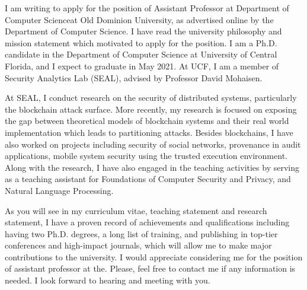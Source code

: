 \documentclass[10pt,stdletter]{newlfm}
\newcommand{\univ}{Old Dominion University}
\newcommand{\depart}{Department of Computer Science}
\begin{document}
\begin{newlfm}

I am writing to apply for the position of Assistant Professor at \depart at \univ, as advertised online by the \depart. I have read the university philosophy and mission statement which motivated to apply for the position. I am a Ph.D. candidate in the Department of Computer Science at University of Central Florida, and I expect to graduate in May 2021. At UCF, I am a member of Security Analytics Lab (SEAL), advised by Professor David Mohaisen. 

At SEAL, I conduct research on the security of distributed systems, particularly the blockchain attack surface. More recently, my research is focused on exposing the gap between theoretical models of blockchain systems and their real world implementation which leads to partitioning attacks. Besides blockchains, I have also worked on projects including security of social networks, provenance in audit applications, mobile system security using the trusted execution environment. Along with the research, I have also engaged in the teaching activities by serving as a teaching assistant for Foundations of Computer Security and Privacy, and Natural Language Processing. 




As you will see in my curriculum vitae, teaching statement and research statement, I have a proven record of achievements and qualifications including having two Ph.D. degrees, a long list of training, and publishing in top-tier conferences and high-impact journals, which will allow me to make major contributions to the university. I would appreciate considering me for the position of assistant professor at the. Please, feel free to contact me if any information is needed. I look forward to hearing and meeting with you.

\end{newlfm}
\end{document}
